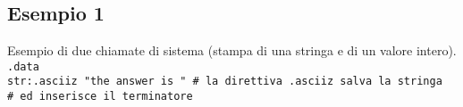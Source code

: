 \documentclass[../main.tex]{subfiles}
\begin{document}
\subsection*{Esempio 1}
Esempio di due chiamate di sistema (stampa di una stringa e di un valore intero). \\[3mm]
\texttt{.data \\
    \hspace*{0cm} \hspace*{0cm} \hspace*{0cm} \hspace*{0cm} str:\hspace*{2.1mm}.asciiz "the answer is " \# la direttiva .asciiz salva la stringa \\
    \hspace*{0cm} \hspace*{0cm} \hspace*{0cm} \hspace*{0cm} \hspace*{0cm} \hspace*{0cm} \hspace*{0cm} \hspace*{0cm} \hspace*{0cm} \hspace*{0cm} \hspace*{0cm} \hspace*{0cm} \hspace*{0cm} \hspace*{0cm} \hspace*{0cm} \hspace*{0cm} \hspace*{0cm} \hspace*{0cm} \hspace*{0cm} \hspace*{0cm} \hspace*{0cm} \hspace*{0cm} \hspace*{0cm} \hspace*{0cm} \hspace*{0cm} \hspace*{0cm} \hspace*{0cm} \hspace*{0cm} \hspace*{0cm} \hspace*{0cm} \hspace*{0cm} \hspace*{0cm} \hspace*{0cm} \hspace*{0cm} \# ed inserisce il terminatore \\
}
\end{document}
